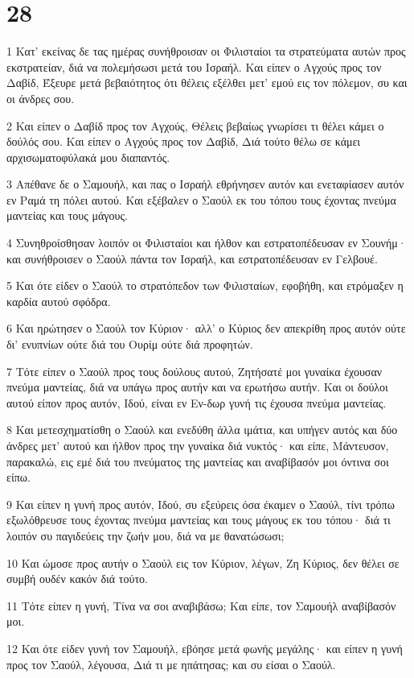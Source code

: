 \chapter{28}

\par 1 Κατ' εκείνας δε τας ημέρας συνήθροισαν οι Φιλισταίοι τα στρατεύματα αυτών προς εκστρατείαν, διά να πολεμήσωσι μετά του Ισραήλ. Και είπεν ο Αγχούς προς τον Δαβίδ, Έξευρε μετά βεβαιότητος ότι θέλεις εξέλθει μετ' εμού εις τον πόλεμον, συ και οι άνδρες σου.
\par 2 Και είπεν ο Δαβίδ προς τον Αγχούς, Θέλεις βεβαίως γνωρίσει τι θέλει κάμει ο δούλός σου. Και είπεν ο Αγχούς προς τον Δαβίδ, Διά τούτο θέλω σε κάμει αρχισωματοφύλακά μου διαπαντός.
\par 3 Απέθανε δε ο Σαμουήλ, και πας ο Ισραήλ εθρήνησεν αυτόν και ενεταφίασεν αυτόν εν Ραμά τη πόλει αυτού. Και εξέβαλεν ο Σαούλ εκ του τόπου τους έχοντας πνεύμα μαντείας και τους μάγους.
\par 4 Συνηθροίσθησαν λοιπόν οι Φιλισταίοι και ήλθον και εστρατοπέδευσαν εν Σουνήμ· και συνήθροισεν ο Σαούλ πάντα τον Ισραήλ, και εστρατοπέδευσαν εν Γελβουέ.
\par 5 Και ότε είδεν ο Σαούλ το στρατόπεδον των Φιλισταίων, εφοβήθη, και ετρόμαξεν η καρδία αυτού σφόδρα.
\par 6 Και ηρώτησεν ο Σαούλ τον Κύριον· αλλ' ο Κύριος δεν απεκρίθη προς αυτόν ούτε δι' ενυπνίων ούτε διά του Ουρίμ ούτε διά προφητών.
\par 7 Τότε είπεν ο Σαούλ προς τους δούλους αυτού, Ζητήσατέ μοι γυναίκα έχουσαν πνεύμα μαντείας, διά να υπάγω προς αυτήν και να ερωτήσω αυτήν. Και οι δούλοι αυτού είπον προς αυτόν, Ιδού, είναι εν Εν-δωρ γυνή τις έχουσα πνεύμα μαντείας.
\par 8 Και μετεσχηματίσθη ο Σαούλ και ενεδύθη άλλα ιμάτια, και υπήγεν αυτός και δύο άνδρες μετ' αυτού και ήλθον προς την γυναίκα διά νυκτός· και είπε, Μάντευσον, παρακαλώ, εις εμέ διά του πνεύματος της μαντείας και αναβίβασόν μοι όντινα σοι είπω.
\par 9 Και είπεν η γυνή προς αυτόν, Ιδού, συ εξεύρεις όσα έκαμεν ο Σαούλ, τίνι τρόπω εξωλόθρευσε τους έχοντας πνεύμα μαντείας και τους μάγους εκ του τόπου· διά τι λοιπόν συ παγιδεύεις την ζωήν μου, διά να με θανατώσωσι;
\par 10 Και ώμοσε προς αυτήν ο Σαούλ εις τον Κύριον, λέγων, Ζη Κύριος, δεν θέλει σε συμβή ουδέν κακόν διά τούτο.
\par 11 Τότε είπεν η γυνή, Τίνα να σοι αναβιβάσω; Και είπε, τον Σαμουήλ αναβίβασόν μοι.
\par 12 Και ότε είδεν γυνή τον Σαμουήλ, εβόησε μετά φωνής μεγάλης· και είπεν η γυνή προς τον Σαούλ, λέγουσα, Διά τι με ηπάτησας; και συ είσαι ο Σαούλ.
